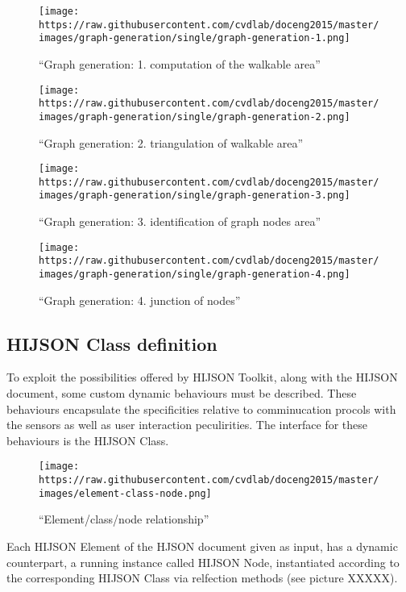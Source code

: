 \documentclass[]{article}
\begin{document}
\begin{figure}[htbp]
\centering
\texttt{[image: https://raw.githubusercontent.com/cvdlab/doceng2015/master/images/graph-generation/single/graph-generation-1.png]}
\caption{``Graph generation: 1. computation of the walkable area''}
\end{figure}

\begin{figure}[htbp]
\centering
\texttt{[image: https://raw.githubusercontent.com/cvdlab/doceng2015/master/images/graph-generation/single/graph-generation-2.png]}
\caption{``Graph generation: 2. triangulation of walkable area''}
\end{figure}

\begin{figure}[htbp]
\centering
\texttt{[image: https://raw.githubusercontent.com/cvdlab/doceng2015/master/images/graph-generation/single/graph-generation-3.png]}
\caption{``Graph generation: 3. identification of graph nodes area''}
\end{figure}

\begin{figure}[htbp]
\centering
\texttt{[image: https://raw.githubusercontent.com/cvdlab/doceng2015/master/images/graph-generation/single/graph-generation-4.png]}
\caption{``Graph generation: 4. junction of nodes''}
\end{figure}

\subsection{HIJSON Class definition}\label{hijson-class-definition}

To exploit the possibilities offered by HIJSON Toolkit, along with the
HIJSON document, some custom dynamic behaviours must be described. These
behaviours encapsulate the specificities relative to comminucation
procols with the sensors as well as user interaction peculirities. The
interface for these behaviours is the HIJSON Class.

\begin{figure}[htbp]
\centering
\texttt{[image: https://raw.githubusercontent.com/cvdlab/doceng2015/master/images/element-class-node.png]}
\caption{``Element/class/node relationship''}
\end{figure}

Each HIJSON Element of the HJSON document given as input, has a dynamic
counterpart, a running instance called HIJSON Node, instantiated
according to the corresponding HIJSON Class via relfection methods (see
picture XXXXX).
\end{document}
